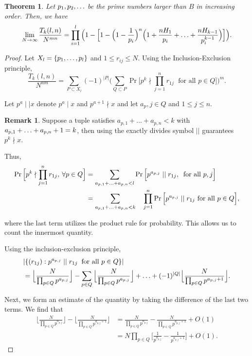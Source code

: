 \documentclass[12pt]{amsart}
\newtheorem{theorem}{Theorem}[subsection]
\theoremstyle{definition}
\newtheorem*{remark}{Remark}
\begin{document}
\begin{theorem}
	Let \(p_1, p_2,\mathellipsis\) be the prime numbers larger than \(B\) in increasing order. Then, we have
	$$\lim_{N\to\infty} \frac{T_k(l,n)}{N^{mn}}=\prod_{i=1}^l\Big(1-\Big[1-\Big(1-\frac{1}{p_i}\Big)^n\Big(1+\frac{nH_1}{p_i}+\mathellipsis+\frac{nH_{k-1}}{p_i^{k-1}}\Big)\Big]\Big).$$
\end{theorem}

\begin{proof}
	Let \(X_l=\{p_1,\mathellipsis,p_l\}\) and \(1\leq r_{ij}\leq N\). Using the Inclusion-Exclusion principle, 
$$\frac{T_k(l,n)}{N^{nm}} = \sum_{P\subset X_l}(-1)^{|P|}\Big(\sum_{Q\subset P}\Pr\Big[p^k\nmid \prod_{j=1}^{n}r_{1j} \; \text{ for all } p\in Q \Big]\Big)^m.$$
	
	Let \(p^a \mid\mid x\) denote \(p^a\mid x\) and \(p^{a+1}\nmid x\) and let \(a_p,j\in Q\) and \(1\leq j \leq n\).
	
    \begin{remark}
		Suppose a tuple satisfies \(a_{p,1}+... +a_{p,n}<k\) with \(a_{p,1}+\mathellipsis+a_{p,n}+1=k\), then using the exactly divides symbol \(||\) guarantees \(p^k \nmid x\).
    \end{remark} 
	
Thus,
        \begin{align*}
		\Pr\Big[p^k\nmid \prod_{j=1}^{n}r_{1j},\:\forall p\in Q\Big] &= \sum_{a_{p,1}+\mathellipsis+a_{p,n}<l}\Pr\Big[p^{a_{p,j}} \mid\mid r_{1j},\: \text{ for all } p,j\Big]\\
		&=\sum_{a_{p,1}+\mathellipsis+a_{p,n}<k}\quad\prod_{j=1}^{n}\Pr\Big[p^{a_{p,j}} \mid\mid r_{1j} \text{ for all } p\in Q\Big],  
	\end{align*}
	
	\noindent where the last term utilizes the product rule for probability. This allows us to count the innermost quantity. 
	
	Using the inclusion-exclusion principle, 
	\begin{align*}
		&|\{(r_{1j}): p^{a_{{p,j}}}\mid\mid r_{1j} \: \text{ for all } p\in Q\}|\\ &= \Big\lfloor\frac{N}{\prod_{p\in Q}p^{a_{p,j}}}\Big\rfloor-\sum_{p\in Q}\Big\lfloor \frac{N}{\prod_{p\in Q}p^{a_{p,j}}}\Big\rfloor+\mathellipsis+(-1)^{|Q|}\Big\lfloor\frac{N}{\prod_{p\in Q}p^{a_{p,j}+1}}\Big\rfloor.
	\end{align*}
	
	Next, we form an estimate of the quantity by taking the difference of the last two terms. We find that
	\begin{align*}
		\Big\lfloor \frac{N}{\prod_{p\in Q} p^{a_{p,j}}} \Big\rfloor - \Big\lfloor \frac{N}{\prod_{p\in Q} p^{a_{p,j}+1}} \Big\rfloor &=
		\frac{N}{\prod_{p\in Q} p^{a_{p,j}}} -  \frac{N}{\prod_{p\in Q} p^{a_{p,j}+1}} + O(1)\\&=
		N\prod_ {p\in Q}\Big[ \frac{1}{ p^{a_{p,j}}}  -  \frac{1}{ p^{a_{p,j}+1}} \Big]+ O(1).
	\end{align*}
	

\end{proof}
\end{document}
